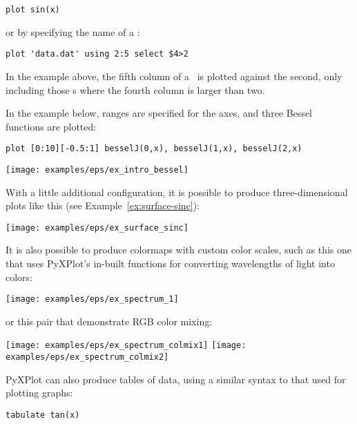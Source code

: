 \begin{verbatim}
plot sin(x)
\end{verbatim}

\noindent or by specifying the name of a \datafile:

\begin{verbatim}
plot 'data.dat' using 2:5 select $4>2
\end{verbatim}

\noindent In the example above, the fifth column of a \datafile\ is plotted
against the second, only including those \datapoint s where the fourth column
is larger than two.

In the example below, ranges are specified for the axes, and three Bessel
functions are plotted:

\begin{verbatim}
plot [0:10][-0.5:1] besselJ(0,x), besselJ(1,x), besselJ(2,x)
\end{verbatim}
\begin{center}
\texttt{[image: examples/eps/ex\_intro\_bessel]}
\end{center}

\noindent With a little additional configuration, it is possible to produce
three-dimensional plots like this (see Example~\ref{ex:surface-sinc}):

\begin{center}
\texttt{[image: examples/eps/ex\_surface\_sinc]}
\end{center}

\noindent It is also possible to produce colormaps with custom color scales,
such as this one that uses PyXPlot's in-built functions for converting
wavelengths of light into colors:

\begin{center}
\texttt{[image: examples/eps/ex\_spectrum\_1]}
\end{center}

\noindent or this pair that demonstrate RGB color mixing:

\begin{center}
\texttt{[image: examples/eps/ex\_spectrum\_colmix1]}
\texttt{[image: examples/eps/ex\_spectrum\_colmix2]}
\end{center}


PyXPlot can also produce tables of data, using a similar syntax to that used
for plotting graphs:

\begin{verbatim}
tabulate tan(x)
\end{verbatim}

